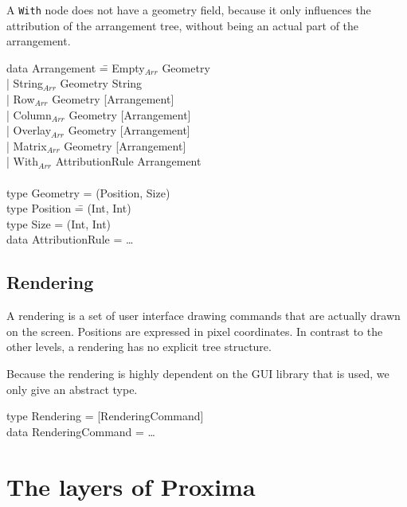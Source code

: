 A \verb|With| node does not have a geometry field, because it only influences the attribution of the arrangement tree, without being an actual part of the arrangement. 
\ttfamily
\begin{tabbing}
data Arrangement \= = Empty$_{Arr}$ Geometry\\
                 \> | String$_{Arr}$ Geometry String\\
                 \> | Row$_{Arr}$ Geometry [Arrangement]\\
                 \> | Column$_{Arr}$ Geometry [Arrangement]\\
                 \> | Overlay$_{Arr}$ Geometry [Arrangement]\\
                 \> | Matrix$_{Arr}$ Geometry [Arrangement]\\
                 \> | With$_{Arr}$ AttributionRule Arrangement\\
\\
type Geometry = (Position, Size)\\
type Position \= = (Int, Int)\\
type Size      \> = (Int, Int)\\
data AttributionRule = \dots\\
\end{tabbing}
\rmfamily

%																
\subsection{Rendering}

A rendering is a set of user interface drawing commands that are actually drawn on the screen. Positions are expressed in pixel coordinates. In contrast to the other levels, a rendering has no explicit tree structure.

Because the rendering is highly dependent on the GUI library that is used, we only give an abstract type.

\noindent
\ttfamily
\begin{tabbing}
type Rendering = [RenderingCommand]\\
data RenderingCommand = \dots
\end{tabbing}
\rmfamily


%																
%																
%																
\section{The layers of Proxima} \label{sect:archProximaLayers}

